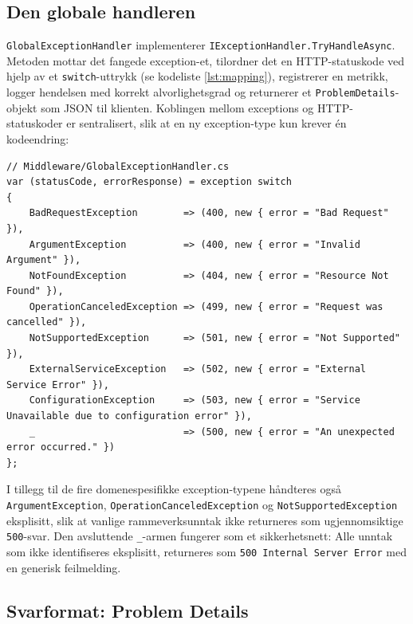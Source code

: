 \subsection{Den globale handleren}
\label{subsec:errors-handler}

\texttt{GlobalExceptionHandler} implementerer \texttt{IExceptionHandler.TryHandleAsync}. Metoden mottar det fangede exception-et, tilordner det en HTTP-statuskode ved hjelp av et \texttt{switch}-uttrykk (se kodeliste \ref{lst:mapping}), registrerer en metrikk, logger hendelsen med korrekt alvorlighetsgrad og returnerer et \texttt{ProblemDetails}-objekt som JSON til klienten. Koblingen mellom exceptions og HTTP-statuskoder er sentralisert, slik at en ny exception-type kun krever én kodeendring:

\begin{lstlisting}[language={[Sharp]C}, caption={Tilordning fra exception-type til HTTP-statuskode}, label={lst:mapping}]
// Middleware/GlobalExceptionHandler.cs
var (statusCode, errorResponse) = exception switch
{
    BadRequestException        => (400, new { error = "Bad Request" }),
    ArgumentException          => (400, new { error = "Invalid Argument" }),
    NotFoundException          => (404, new { error = "Resource Not Found" }),
    OperationCanceledException => (499, new { error = "Request was cancelled" }),
    NotSupportedException      => (501, new { error = "Not Supported" }),
    ExternalServiceException   => (502, new { error = "External Service Error" }),
    ConfigurationException     => (503, new { error = "Service Unavailable due to configuration error" }),
    _                          => (500, new { error = "An unexpected error occurred." })
};
\end{lstlisting}

I tillegg til de fire domenespesifikke exception-typene håndteres også \texttt{ArgumentException}, \texttt{OperationCanceledException} og \texttt{NotSupportedException} eksplisitt, slik at vanlige rammeverksunntak ikke returneres som ugjennomsiktige \texttt{500}-svar. Den avsluttende \texttt{\_}-armen fungerer som et sikkerhetsnett: Alle unntak som ikke identifiseres eksplisitt, returneres som \texttt{500 Internal Server Error} med en generisk feilmelding.

\subsection{Svarformat: Problem Details}
\label{subsec:errors-problemdetails}

